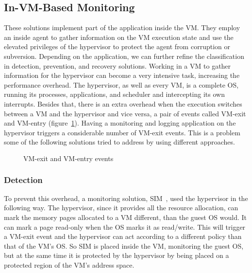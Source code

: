 \subsection{In-\ac{VM}-Based Monitoring}\label{sub:invm}
These solutions implement part of the application inside the \ac{VM}. They employ an inside agent to gather information on the \ac{VM} execution state and use the elevated privileges of the hypervisor to protect the agent from corruption or subversion. Depending on the application, we can further refine the classification in detection, prevention, and recovery solutions. Working in a \ac{VM} to gather information for the hypervisor can become a very intensive task, increasing the performance overhead. The hypervisor, as well as every \ac{VM}, is a complete \ac{OS}, running its processes, applications, and scheduler and intercepting its own interrupts. Besides that, there is an extra overhead when the execution switches between a \ac{VM} and the hypervisor and vice versa, a pair of events called VM-exit and VM-entry (figure~\ref{fig:vmevents}). Having a monitoring and logging application on the hypervisor triggers a considerable number of VM-exit events. This is a problem some of the following solutions tried to address by using different approaches.

\begin{figure}[ht]
	\centering
	
	\caption{VM-exit and VM-entry events}
	\label{fig:vmevents}
\end{figure}

\subsubsection{Detection}

To prevent this overhead, a monitoring solution, SIM~\cite{sharif2009secure}, used the hypervisor in the following way. The hypervisor, since it provides all the resource allocation, can mark the memory pages allocated to a \ac{VM} different, than the guest \ac{OS} would. It can mark a page read-only when the \ac{OS} marks it as read/write. This will trigger a \ac{VM}-exit event and the hypervisor can act according to a different policy than that of the \ac{VM}’s \ac{OS}. So SIM is placed inside the \ac{VM}, monitoring the guest \ac{OS}, but at the same time it is protected by the hypervisor by being placed on a protected region of the \ac{VM}’s address space. 

